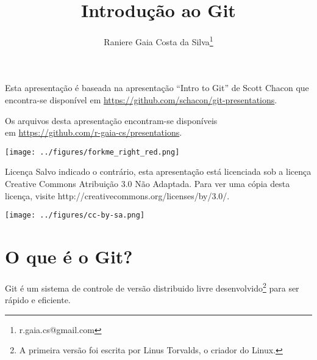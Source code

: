 \documentclass[11pt]{beamer}
\begin{document}
\title{Introdução ao Git}
\author[Raniere Silva]{Raniere Gaia Costa da
Silva\footnote{r.gaia.cs@gmail.com}}

\begin{frame}
    \maketitle
\end{frame}

\begin{frame}
    Esta apresentação é baseada na apresentação ``Intro to Git'' de Scott
    Chacon que encontra-se disponível em
    \url{https://github.com/schacon/git-presentations}.

    \begin{block}{}
        Os arquivos desta apresentação encontram-se disponíveis \\
        em \url{https://github.com/r-gaia-cs/presentations}. \\
        \vspace{-33pt}
        \begin{flushright}
            \texttt{[image: ../figures/forkme\_right\_red.png]}
        \end{flushright}
    \end{block}

    \begin{block}{Licença}
        Salvo indicado o contrário, esta apresentação está licenciada sob a licença
        Creative Commons Atribuição 3.0 Não Adaptada. Para ver uma cópia desta
        licença, visite http://creativecommons.org/licenses/by/3.0/.
        \begin{center}
            \texttt{[image: ../figures/cc-by-sa.png]}
        \end{center}
    \end{block}
\end{frame}

\begin{frame}
    \tableofcontents
\end{frame}

\section{O que é o Git?}
\begin{frame}
    Git é um sistema de controle de versão distribuido livre
    desenvolvido\footnote{A primeira versão foi escrita por Linus Torvalds, o
    criador do Linux.} para
    ser rápido e eficiente.
\end{frame}
\end{document}
